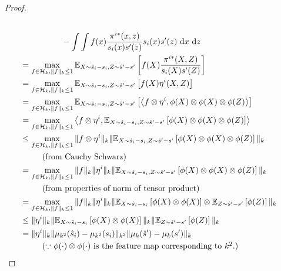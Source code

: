 \begin{proof}
\begin{align*}
    \nonumber\\
    &\qquad\qquad\quad-\int \int f(x) \frac{\pi^{i*}(x, z)}{s_i(x)s'(z)}s_i(x)s'(z)~\textup{d}x~\textup{d}z\\
    &=\max\limits_{f\in \mathcal{H}_k, \|f\|_k\leq 1} \mathbb{E}_{X\sim \hat{s}_i-s_i, Z\sim \hat{s}'-s'}\left[f(X)\frac{\pi^{i*}(X, Z)}{s_i(X)s'(Z)}\right]\\
    &=\max\limits_{f\in \mathcal{H}_k, \|f\|_k\leq 1} \mathbb{E}_{X\sim \hat{s}_i-s_i, Z\sim \hat{s}'-s'}\left[f(X)\eta^i(X, Z)\right]\\
    & =  \max\limits_{f\in \mathcal{H}_k, \|f\|_k\leq 1} \mathbb{E}_{X\sim \hat{s}_i-s_i, Z\sim \hat{s}'-s'}\left[\left<f\otimes \eta^i, \phi(X)\otimes\phi(X)\otimes \phi(Z)\right>\right] \\
    & =  \max\limits_{f\in \mathcal{H}_k, \|f\|_k\leq 1} \left<f\otimes \eta^i, \mathbb{E}_{X\sim \hat{s}_i-s_i, Z\sim \hat{s}'-s'}\left[\phi(X)\otimes\phi(X)\otimes \phi(Z)\right]\right> \\
    & \leq  \max\limits_{f\in \mathcal{H}_k, \|f\|_k\leq 1} \|f\otimes \eta^i\|_k\|\mathbb{E}_{X\sim \hat{s}_i-s_i, Z\sim \hat{s}'-s'}\left[\phi(X)\otimes\phi(X)\otimes \phi(Z)\right]\|_k \\ &\ \ \tag{from Cauchy Schwarz}\\
    &= \max\limits_{f\in \mathcal{H}_k, \|f\|_k\leq 1} \|f\|_k\|\eta^i\|_k\|\mathbb{E}_{X\sim \hat{s}_i-s_i, Z\sim \hat{s}'-s'}\left[\phi(X)\otimes \phi(X)\otimes \phi(Z)\right]\|_k\\
    &\ \ \tag{from properties of norm of tensor product}\\
    &= \max\limits_{f\in \mathcal{H}_k, \|f\|_k\leq 1} \|f\|_k\|\eta^i\|_k\|\mathbb{E}_{X\sim \hat{s}_i-s_i}\left[\phi(X)\otimes \phi(X)\right]\otimes\mathbb{E}_{Z\sim \hat{s}'-s'}\left[\phi(Z)\right]\|_k\\
    & \leq \|\eta^i\|_k\|\mathbb{E}_{X\sim \hat{s}_i-s_i}\left[\phi(X)\otimes \phi(X)\right]\|_k\|\mathbb{E}_{Z\sim \hat{s}'-s'}\left[\phi(Z)\right]\|_k\\
    & = \|\eta^i\|_k\|\mu_{k^2}(\hat{s}_i)-\mu_{k^2}(s_i)\|_{k^2}\|\mu_{k}(\hat{s}')-\mu_{k}(s')\|_{k}\\
    &\ \ \tag{$\because$ $\phi(\cdot)\otimes\phi(\cdot)$ is the feature map corresponding to $k^2.$}
\end{align*}


\end{proof}
